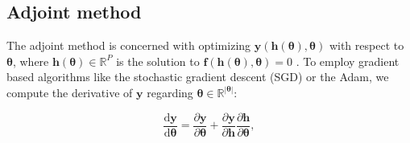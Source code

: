 \documentclass{article}
\newcommand{\R}{\mathbb{R}}
\newcommand{\diff}{\mathrm{d}}
\newcommand{\bpsi}{\boldsymbol{\psi}}
\newcommand{\ka}[1]{{\color{brown} Kavosh: #1 }}
\begin{document}
\subsection{Adjoint method}
\label{sec:adjoint}
The adjoint method is concerned with optimizing $\mathbf{y}(\mathbf{h}(\boldsymbol{\theta}),\boldsymbol{\theta})$ with respect to $\boldsymbol{\theta}$, where $\mathbf{h}(\boldsymbol{\theta})\in\R^P$ is the solution to $\mathbf{f}(\mathbf{h}(\boldsymbol{\theta}),\boldsymbol{\theta})=0$ \citep{CAO2002171}. To employ gradient based algorithms like the stochastic gradient descent (SGD) or the Adam, we compute the derivative of $\mathbf{y}$ regarding $\boldsymbol{\theta}\in\R^{|\boldsymbol{\theta}|}$:

\begin{equation}
    \frac{\diff \mathbf{y}}{\diff \boldsymbol{\theta}} = \frac{\partial \mathbf{y}}{\partial \boldsymbol{\theta}} + \frac{\partial \mathbf{y}}{\partial \mathbf{h}}\frac{\partial \mathbf{h}}{\partial \boldsymbol{\theta}},
\end{equation}
\end{document}
